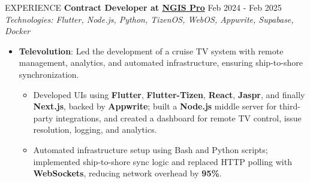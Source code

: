 \documentclass{resume}
\begin{document}
\begin{rSection}{EXPERIENCE}
    \textbf{Contract Developer at \href{https://ngispro.com/}{NGIS Pro}} \hfill Feb 2024 - Feb 2025\\
    \textit{Technologies: Flutter, Node.js, Python, TizenOS, WebOS, Appwrite, Supabase, Docker}
    \begin{itemize}
        \itemsep -3pt {}
        \item \textbf{Televolution}: Led the development of a cruise TV system with remote management, analytics, and automated infrastructure, ensuring ship-to-shore synchronization.
              \begin{itemize}
                  \itemsep -3pt {}
                  \item Developed UIs using \textbf{Flutter}, \textbf{Flutter-Tizen}, \textbf{React}, \textbf{Jaspr}, and finally \textbf{Next.js}, backed by \textbf{Appwrite}; built a \textbf{Node.js} middle server for third-party integrations, and created a dashboard for remote TV control, issue resolution, logging, and analytics.
                  \item Automated infrastructure setup using Bash and Python scripts; implemented ship-to-shore sync logic and replaced HTTP polling with \textbf{WebSockets}, reducing network overhead by \textbf{95\%}.
              \end{itemize}

\end{itemize}
\end{rSection}
\end{document}
